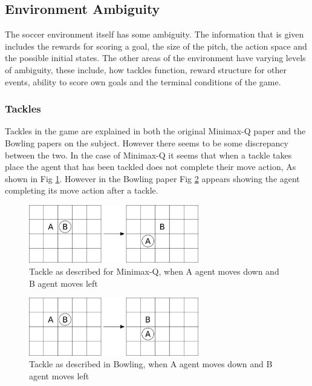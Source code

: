 \documentclass{article}
\begin{document}
\subsection*{Environment Ambiguity}

The soccer environment itself has some ambiguity. The information that is given includes the rewards for scoring a goal, the size of the pitch, the action space and the possible initial states. The other areas of the environment have varying levels of ambiguity, these include, how tackles function, reward structure for other events, ability to score own goals and the terminal conditions of the game.

\subsubsection*{Tackles}

Tackles in the game are explained in both the original Minimax-Q paper and the Bowling papers on the subject. However there seems to be some discrepancy between the two. In the case of Minimax-Q it seems that when a tackle takes place the agent that has been tackled does not complete their move action, As shown in Fig \ref{fig:minimax-tackle}. However in the Bowling paper Fig \ref{fig:bowling-tackle} appears showing the agent completing its move action after a tackle. 

\begin{figure}
    \centering
    \includegraphics[width=20em]{./Figures/minimax-tackle.png}
    \caption{Tackle as described for Minimax-Q, when A agent moves down and B agent moves left}
    \label{fig:minimax-tackle}
\end{figure}

\begin{figure}
    \centering
    \includegraphics[width=20em]{./Figures/bowling-tackle.png}
    \caption{Tackle as described in Bowling, when A agent moves down and B agent moves left}
    \label{fig:bowling-tackle}
\end{figure}
\end{document}
